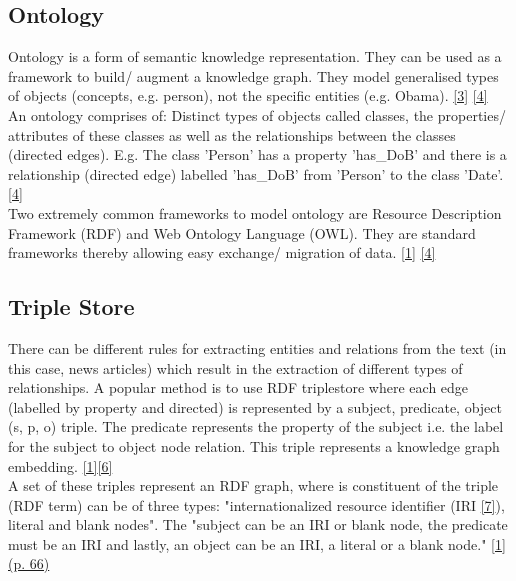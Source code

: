 \subsection{Ontology}

Ontology is a form of semantic knowledge representation. They can be used as a framework to build/ augment a knowledge graph. They model generalised types of objects (concepts, e.g. person), not the specific entities (e.g. Obama). \hyperlink{3}{[3]} \hyperlink{4}{[4]}\\

An ontology comprises of: Distinct types of objects called classes, the properties/ attributes of these classes as well as the relationships between the classes (directed edges). E.g. The class 'Person' has a property 'has\_DoB' and there is a relationship (directed edge) labelled 'has\_DoB' from 'Person' to the class 'Date'.  \hyperlink{4}{[4]}\\

Two extremely common frameworks to model ontology are Resource Description Framework (RDF) and Web Ontology Language (OWL). They are standard frameworks thereby allowing easy exchange/ migration of data. \hyperlink{1}{[1]} \hyperlink{4}{[4]}

\subsection{Triple Store}

There can be different rules for extracting entities and relations from the text (in this case, news articles) which result in the extraction of different types of relationships. A popular method is to use RDF triplestore where each edge (labelled by property and directed) is represented by a subject, predicate, object (s, p, o) triple. The
predicate represents the property of the subject i.e. the label for the subject to object node relation. This triple represents a knowledge graph embedding. \hyperlink{1}{[1]}\hyperlink{6}{[6]}\\

A set of these
triples represent an RDF graph, where is constituent of the triple (RDF term) can be of three types: "internationalized resource identifier (IRI \hyperlink{7}{[7]}), literal and blank nodes". The "subject can be an IRI or blank node, the predicate must be an IRI and lastly, an object can be an IRI, a literal or a blank node." \hyperlink{1}{[1](p. 66)}\\



